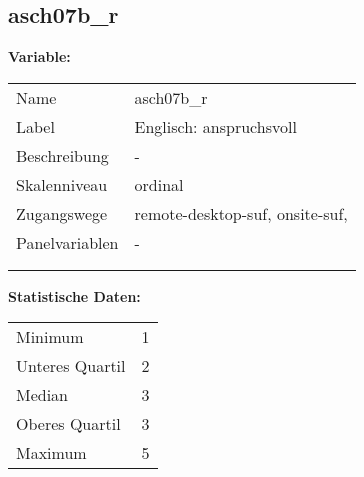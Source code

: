 	
	
	\subsection{asch07b\_r}
	\label{subSection:asch07b_r}

	\noindent\textbf{Variable:}\\
		\begin{tabular}{lL{11.3cm}}
			\label{tableVariable:asch07b_r}
			Name & asch07b\_r \\
			Label & Englisch: anspruchsvoll \\
			Beschreibung & - \\
			Skalenniveau & ordinal \\
			Zugangswege &
				remote-desktop-suf,
				onsite-suf,
 \\
			Panelvariablen & -
			 \\
			 \\
 \\
		\end{tabular}



		\vspace*{1 cm}
		\noindent\textbf{Statistische Daten:}\\
			\begin{tabular}{ll}
				\label{tableStatistics:asch07b_r}
					Minimum & 1 \\
					Unteres Quartil & 2 \\
					Median & 3 \\
					Oberes Quartil & 3 \\
					Maximum & 5 \\
			\end{tabular}



